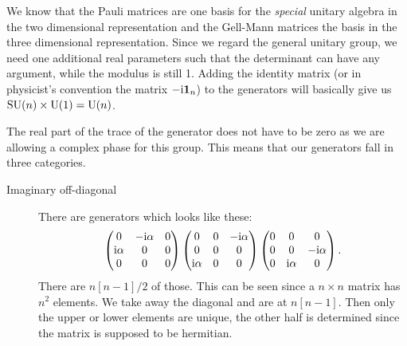 \documentclass[11pt, english, fleqn, DIV=15, headinclude, BCOR=1cm]{scrartcl}
\begin{document}
We know that the Pauli matrices are one basis for the \emph{special} unitary
algebra in the two dimensional representation and the Gell-Mann matrices the
basis in the three dimensional representation. Since we regard the general
unitary group, we need one additional real parameters such that the determinant
can have any argument, while the modulus is still 1. Adding the identity matrix
(or in physicist's convention the matrix $- \iup \mat 1_n$) to the generators
will basically give us $\mathrm{SU}(n) \times \mathrm U(1) = \mathrm U(n)$.

The real part of the trace of the generator does not have to be zero as we are
allowing a complex phase for this group. This means that our generators fall in
three categories.

\begin{description}
    \item[Imaginary off-diagonal]
        There are generators which looks like these:
        \[
            \begin{pmatrix}
                0 & - \mathrm i \alpha & 0 \\
                \mathrm i \alpha & 0 & 0 \\
                0 & 0 & 0
            \end{pmatrix}
            \begin{pmatrix}
                0 & 0 & - \mathrm i \alpha \\
                0 & 0 & 0 \\
                \mathrm i \alpha & 0 & 0
            \end{pmatrix}
            \begin{pmatrix}
                0 & 0 & 0 \\
                0 & 0 & - \mathrm i \alpha \\
                0 & \mathrm i \alpha & 0 \\
            \end{pmatrix}
            .
        \]
        There are $n[n-1]/2$ of those. This can be seen since a $n \times n$
        matrix has $n^2$ elements. We take away the diagonal and are at
        $n[n-1]$. Then only the upper or lower elements are unique, the other
        half is determined since the matrix is supposed to be hermitian.


\end{description}
\end{document}
